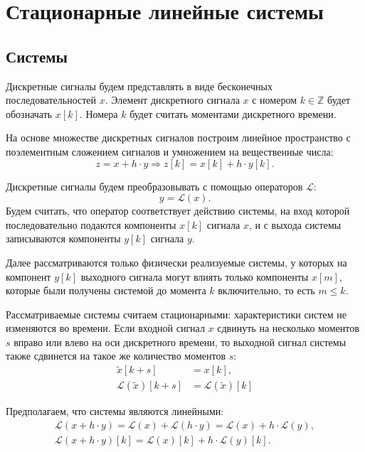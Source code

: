 \chapter{Стационарные линейные системы}


\section{Системы}

Дискретные сигналы будем представлять в виде бесконечных последовательностей $x$. Элемент дискретного сигнала $x$ с номером $k \in \mathbb{Z}$ будет обозначать $x[k]$.
Номера $k$ будет считать моментами дискретного времени.

На основе множестве дискретных сигналов построим линейное пространство с поэлементным сложением сигналов и умножением на вещественные числа:
\[
    z = x + h \cdot y \Rightarrow z[k] = x[k] + h \cdot y[k].
\]

Дискретные сигналы будем преобразовывать с помощью операторов $\mathcal{L}$:
\[
    y = \mathcal{L}(x).
\]
Будем считать, что оператор соответствует действию системы, на вход которой последовательно подаются компоненты $x[k]$ сигнала $x$, и с выхода системы записываются компоненты
$y[k]$ сигнала $y$.

Далее рассматриваются только физически реализуемые системы, у которых на компонент $y[k]$ выходного сигнала могут влиять только компоненты $x[m]$, которые были получены системой
до момента $k$ включительно, то есть $m \le k$.

Рассматриваемые системы считаем стационарными: характеристики систем не изменяются во времени. Если входной сигнал $x$ сдвинуть на несколько моментов $s$ вправо или влево
на оси дискретного времени, то выходной сигнал системы также сдвинется на такое же количество моментов $s$:
\begin{align*}
    \widetilde{x}[k+s]              & = x[k] , \\
    \mathcal{L}(\widetilde{x})[k+s] & = \mathcal{L}(\widetilde{x})[k]
\end{align*}

Предполагаем, что системы являются линейными:
\begin{gather*}
    \mathcal{L}(x + h \cdot y)
    = \mathcal{L}(x) + \mathcal{L}(h \cdot y)
    = \mathcal{L}(x) + h \cdot \mathcal{L}(y) , \\
    \mathcal{L}(x + h \cdot y)[k]
    = \mathcal{L}(x)[k] + h \cdot \mathcal{L}(y)[k] .
\end{gather*}


